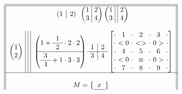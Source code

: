\documentclass{article}
\begin{document}
\[\begin{array}{||c||}
	\hline \hline
 	\begin{array}{c|c}
      	(1 & 2)
 	\end{array}
 	\begin{pmatrix}
    	1 ~\vline~ 2 \\
    	3 ~\vline~  4
 	\end{pmatrix}
 	\begin{pmatrix}
    	1 ~\vline~\vline~ 2 \\
    	3 ~\vline~\vline~  4
 	\end{pmatrix} \\\\
 	\begin{pmatrix}
    	1 \\
    	2
 	\end{pmatrix}~\vline~\vline~\vline~
 	\begin{pmatrix}
    	1 + \begin{array}{c}
         	1  \\\hline
         	2
    	\end{array} \cdot 2 \cdot 2 \\ \hline
    	\begin{array}{c}
         	3  \\\hline
         	4
    	\end{array} + 1 \cdot 3 \cdot 3
 	\end{pmatrix}
	\begin{array}{c|c}
    	1 & 2 \\\hline
    	3 & 4
	\end{array}
	\begin{bmatrix}
    	\begin{array}{@{\cdot}c@{\cdot}c@{\cdot}c@{\cdot}}
         	~1 ~&~ 2 ~&~ 3~ \\
         	~ <0 ~&~ <> ~&~ 0>~ \\
         	~ 4 ~&~ 5 ~&~ 6~ \\
         	~ <0 ~&~ <\hspace{-0.25cm}> ~&~ 0>~ \\
         	~ 7 ~&~ 8 ~&~ 9~ \\
    	\end{array}
	\end{bmatrix}
 	\\ \hline\\
 	M = \begin{Bmatrix}
     	\begin{array}{c}
          	x  \\\hline

\end{array}
\end{Bmatrix}
\end{array}\]
\end{document}

